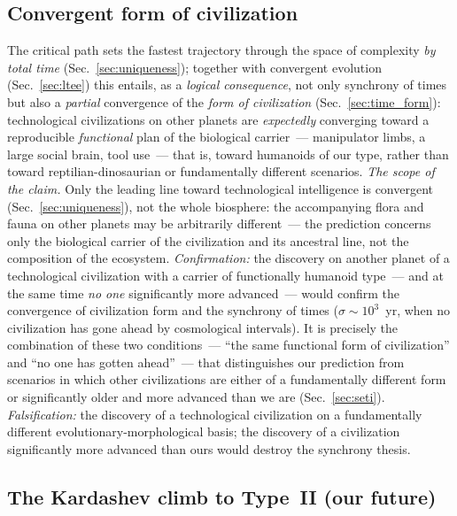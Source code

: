 \documentclass[11pt,a4paper]{article}
\begin{document}
\subsection{Convergent form of civilization}
\label{sec:pred_convergent_form}

The critical path sets the fastest trajectory through the space of complexity \emph{by total time} (Sec.~\ref{sec:uniqueness}); together with convergent evolution (Sec.~\ref{sec:ltee}) this entails, as a \emph{logical consequence}, not only synchrony of times but also a \emph{partial} convergence of the \emph{form of civilization} (Sec.~\ref{sec:time_form}): technological civilizations on other planets are \emph{expectedly} converging toward a reproducible \emph{functional} plan of the biological carrier~--- manipulator limbs, a large social brain, tool use~--- that is, toward humanoids of our type, rather than toward reptilian-dinosaurian or fundamentally different scenarios. \emph{The scope of the claim.} Only the leading line toward technological intelligence is convergent (Sec.~\ref{sec:uniqueness}), not the whole biosphere: the accompanying flora and fauna on other planets may be arbitrarily different~--- the prediction concerns only the biological carrier of the civilization and its ancestral line, not the composition of the ecosystem. \emph{Confirmation:} the discovery on another planet of a technological civilization with a carrier of functionally humanoid type~--- and at the same time \emph{no one} significantly more advanced~--- would confirm the convergence of civilization form and the synchrony of times ($\sigma \sim 10^3$~yr, when no civilization has gone ahead by cosmological intervals). It is precisely the combination of these two conditions~--- ``the same functional form of civilization'' and ``no one has gotten ahead''~--- that distinguishes our prediction from scenarios in which other civilizations are either of a fundamentally different form or significantly older and more advanced than we are (Sec.~\ref{sec:seti}). \emph{Falsification:} the discovery of a technological civilization on a fundamentally different evolutionary-morphological basis; the discovery of a civilization significantly more advanced than ours would destroy the synchrony thesis.

\subsection{The Kardashev climb to Type~II (our future)}
\label{sec:pred_kardashev}
\end{document}
